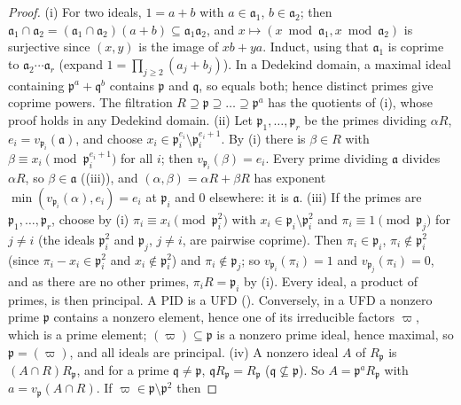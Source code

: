 \begin{proof}
(i) For two ideals, $1=a+b$ with $a\in\mathfrak a_1$, $b\in\mathfrak a_2$; then $\mathfrak a_1\cap\mathfrak a_2=(\mathfrak a_1\cap\mathfrak a_2)(a+b)\subseteq\mathfrak a_1
\mathfrak a_2$, and $x\mapsto(x\bmod\mathfrak a_1,x\bmod\mathfrak a_2)$ is surjective since $(x,y)$ is the image of $xb+ya$. Induct, using that
$\mathfrak a_1$ is coprime to $\mathfrak a_2\cdots\mathfrak a_r$ (expand $1=\prod_{j\ge2}(a_j+b_j)$). In a Dedekind domain, a maximal ideal containing
$\mathfrak p^a+\mathfrak q^b$ contains $\mathfrak p$ and $\mathfrak q$, so equals both; hence distinct primes give coprime powers. The filtration
$R\supseteq\mathfrak p\supseteq\dots\supseteq\mathfrak p^a$ has the quotients of (i), whose proof holds in any Dedekind domain.
(ii) Let $\mathfrak p_1,\dots,\mathfrak p_r$ be the primes dividing $\alpha R$, $e_i=v_{\mathfrak p_i}(\mathfrak a)$, and choose $x_i\in\mathfrak p_i^{e_i}\setminus
\mathfrak p_i^{e_i+1}$. By (i) there is $\beta\in R$ with $\beta\equiv x_i\pmod{\mathfrak p_i^{e_i+1}}$ for all $i$; then $v_{\mathfrak p_i}(\beta)=e_i$. Every
prime dividing $\mathfrak a$ divides $\alpha R$, so $\beta\in\mathfrak a$ ((iii)), and $(\alpha,\beta)=\alpha R+\beta R$
has exponent $\min(v_{\mathfrak p_i}(\alpha),e_i)=e_i$ at $\mathfrak p_i$ and $0$ elsewhere: it is $\mathfrak a$.
(iii) If the primes are $\mathfrak p_1,\dots,\mathfrak p_r$, choose by (i) $\pi_i\equiv x_i\pmod{\mathfrak p_i^2}$ with $x_i\in\mathfrak p_i\setminus\mathfrak p_i^2$
and $\pi_i\equiv1\pmod{\mathfrak p_j}$ for $j\ne i$ (the ideals $\mathfrak p_i^2$ and $\mathfrak p_j$, $j\ne i$, are pairwise coprime). Then $\pi_i\in\mathfrak p_i$,
$\pi_i\notin\mathfrak p_i^2$ (since $\pi_i-x_i\in\mathfrak p_i^2$ and $x_i\notin\mathfrak p_i^2$) and $\pi_i\notin\mathfrak p_j$; so $v_{\mathfrak p_i}(\pi_i)=1$ and
$v_{\mathfrak p_j}(\pi_i)=0$, and as there are no other primes, $\pi_iR=\mathfrak p_i$ by (i). Every ideal, a product of primes, is
then principal. A PID is a UFD
(). Conversely, in a UFD a nonzero prime $\mathfrak p$ contains a nonzero element, hence one of its irreducible factors $\varpi$, which
is a prime element; $(\varpi)\subseteq\mathfrak p$ is a nonzero prime ideal, hence maximal, so $\mathfrak p=(\varpi)$, and all ideals are principal.
(iv) A nonzero ideal $A$ of $R_{\mathfrak p}$ is $(A\cap R)R_{\mathfrak p}$, and for a prime $\mathfrak q\ne\mathfrak p$, $\mathfrak qR_{\mathfrak p}=R_{\mathfrak p}$
($\mathfrak q\not\subseteq\mathfrak p$). So $A=\mathfrak p^aR_{\mathfrak p}$ with $a=v_{\mathfrak p}(A\cap R)$. If $\varpi\in\mathfrak p\setminus\mathfrak p^2$ then

\end{proof}
